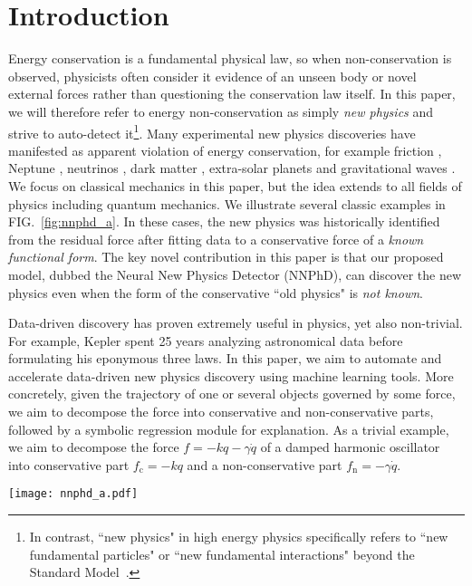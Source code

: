 \documentclass[aps,pre,reprint,superscriptaddress,nofootinbib,amsmath,amssymb]{revtex4-2}
\begin{document}
\section{Introduction}

Energy conservation is a fundamental physical law, so when non-conservation is observed, physicists often consider it evidence of an unseen body or novel external forces rather than questioning the conservation law itself. In this paper, we will therefore refer to energy non-conservation as simply 
\textit{new physics} and strive to auto-detect it\footnote{In contrast, ``new physics" in high energy physics specifically refers to ``new fundamental particles" or ``new fundamental interactions" beyond the Standard Model~\cite{burgess2007standard}.}.
Many experimental new physics discoveries have manifested as apparent violation of energy conservation, for example friction \cite{HUTCHINGS201651}, Neptune \cite{Leverrier}, neutrinos \cite{Cowan1956},
dark matter \cite{Zwicky,Rubin},
extra-solar planets \cite{wolszczan1992planetary} and gravitational waves \cite{HulseTaylor}. We focus on classical mechanics in this paper, but the idea extends to all fields of physics including quantum mechanics. We illustrate several classic examples in FIG.~\ref{fig:nnphd_a}. 
In these cases, the new physics was historically identified from the residual force after fitting data to a conservative force of a {\it known functional form}. 
The key novel contribution in this paper is that our proposed model, dubbed the Neural New Physics Detector (NNPhD), can discover the new physics even when the form of the conservative ``old physics" is {\it not known}.

Data-driven discovery has proven extremely useful in physics, yet also non-trivial. For example, Kepler spent 25 years analyzing astronomical data before formulating his eponymous three laws. In this paper, we aim to automate and accelerate data-driven new physics discovery using machine learning tools. More concretely, given the trajectory of one or several objects governed by some force, we aim to decompose the force into conservative and non-conservative parts, followed by a symbolic regression module for explanation. As a trivial example, we aim to decompose the force $f=-kq-\gamma\dot{q}$ of a damped harmonic oscillator into conservative part $f_{\mathrm{c}}=-kq$ and a non-conservative part $f_{\mathrm{n}}=-\gamma\dot{q}$. 

\onecolumngrid

\begin{figure*}[h]
	\centering
	\texttt{[image: nnphd\_a.pdf]}
	\vskip 0.8cm
	\caption{NNPhD can auto-rediscover several classic examples.}
	\label{fig:nnphd_a}
	\vskip -0.5cm
\end{figure*}
\end{document}
